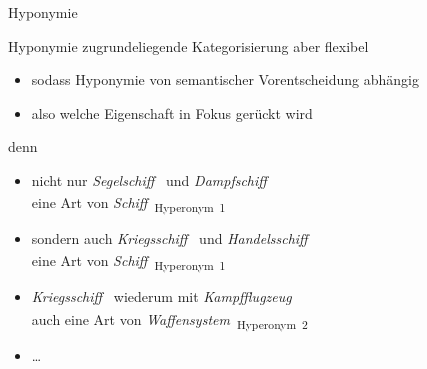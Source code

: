 \begin{frame}{Hyponymie}
\onslide<+->
\center
\tikzset{level distance=40pt,sibling distance=5pt}
\end{frame}

\begin{frame}{Hyponymie}
\onslide<+->
zugrundeliegende Kategorisierung aber flexibel
\Halbzeile
\begin{itemize}[<+->]
	\item		sodass Hyponymie von semantischer Vorentscheidung abhängig
	\item		also welche Eigenschaft in Fokus gerückt wird
\end{itemize}
\onslide<+->
\Zeile
denn
\Halbzeile
\begin{itemize}[<+->]
	\item		nicht nur \textit{Segelschiff}~\textsubscript{} und \textit{Dampfschiff}~\textsubscript{}\\
          eine Art von \textit{Schiff}~\textsubscript{\alert{Hyperonym~1}}
          \Viertelzeile
	\item		sondern auch \textit{Kriegsschiff}~\textsubscript{} und \textit{Handelsschiff}~\textsubscript{}\\
          eine Art von \textit{Schiff}~\textsubscript{\alert{Hyperonym~1}}
          \Viertelzeile
	\item		\textit{Kriegsschiff}~\textsubscript{} wiederum mit \textit{Kampfflugzeug}~\textsubscript{}\\
          auch eine Art von \textit{Waffensystem}~\textsubscript{\alert{Hyperonym~2}}
          \Viertelzeile
	\item		{\ldots}
\end{itemize}
\end{frame}

